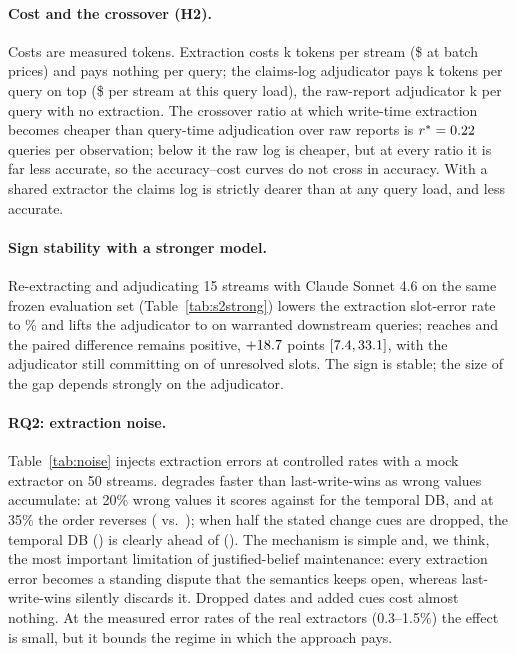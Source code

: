 \paragraph{Cost and the crossover (H2).} Costs are measured tokens. Extraction costs \xE{}k tokens per stream (\$\sTwoPalCost{} at batch prices) and \pal{} pays nothing per query; the claims-log adjudicator pays \xAlog{}k tokens per query on top (\$\sTwoLogCost{} per stream at this query load), the raw-report adjudicator \xAnl{}k per query with no extraction. The crossover ratio at which write-time extraction becomes cheaper than query-time adjudication over raw reports is $r^*=0.22$ queries per observation; below it the raw log is cheaper, but at every ratio it is far less accurate, so the accuracy--cost curves do not cross in accuracy. With a shared extractor the claims log is strictly dearer than \pal{} at any query load, and less accurate.

\paragraph{Sign stability with a stronger model.}

Re-extracting and adjudicating 15 streams with Claude Sonnet 4.6 on the same frozen evaluation set (Table~\ref{tab:s2strong}) lowers the extraction slot-error rate to \sStrongExtSlot\% and lifts the adjudicator to \sStrongLogWarr{} on warranted downstream queries; \pal{} reaches \sStrongPalWarr{} and the paired difference remains positive, $+18.7$ points $[7.4, 33.1]$, with the adjudicator still committing on \sStrongLogCommit{} of unresolved slots. The sign is stable; the size of the gap depends strongly on the adjudicator.

\paragraph{RQ2: extraction noise.}

Table~\ref{tab:noise} injects extraction errors at controlled rates with a mock extractor on 50 streams. \pal{} degrades faster than last-write-wins as wrong values accumulate: at 20\% wrong values it scores \nzSlotTwentyPal{} against \nzSlotTwentyTdb{} for the temporal DB, and at 35\% the order reverses (\nzSlotThirtyfivePal{} vs.\ \nzSlotThirtyfiveTdb); when half the stated change cues are dropped, the temporal DB (\nzCueFiftyTdb) is clearly ahead of \pal{} (\nzCueFiftyPal). The mechanism is simple and, we think, the most important limitation of justified-belief maintenance: every extraction error becomes a standing dispute that the semantics keeps open, whereas last-write-wins silently discards it. Dropped dates and added cues cost almost nothing. At the measured error rates of the real extractors (0.3--1.5\%) the effect is small, but it bounds the regime in which the approach pays.

